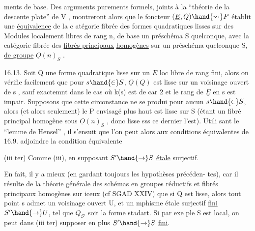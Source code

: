 
ments de base. Des arguments purements formels, joints à la
``théorie de la descente plate'' de  V  , montreront alors que le foncteur
$(\underline{E},Q) \hand{\rightsquigarrow} P$ établit une \uline{équivalence} de la c atégorie fibrée des formes
quadratiques lisses sur des Modules localement libres de rang n, de base
un préschéma S quelconque, avec la catégorie fibrée des \uline{fibrés principaux}
\uline{homogènes} sur un préschéma quelconque S, \uline{de groupe} $\underline{O}(n)_S$ .

16.13. Soit Q une forme quadratique lisse sur un $\underline{E}$ loc libre de
rang fini, alors on vérifie facilement que pour $s \hand{\in} S$, $\underline{O}(Q)$ est lisse
sur un voisinage ouvert de s ,  sauf exactemnt dans
le cas où k(s) est de car 2 et le rang de $\underline{E}$ en s est impair. Supposons
que cette circonstance ne se produi pour aucun $s \hand{\in} S$, alors (et alors
seulement) le P envisagé plus haut est lisse sur S (étant un fibré
principal homogène sous $\underline{O}(n)_S$ , donc lisse sss ce dernier l'est). Utili
sant le ``lemme de Hensel'' , il s'ensuit que  l'on peut alors aux
conditions équivalentes de 16.9. adjoindre la condition  équivalente

(iii ter)  Comme (iii), en supposant $S' \hand{\to} S$
\uline{étale} surjectif.

En fait, il y a mieux (en gardant toujours les hypothèses précéden-%
tes), car il résulte de la théorie générale des schémas en groupes réductifs
et fibrés principaux homogènes sur iceux (cf SGAD XXIV) que  si Q est
lisse, alors tout point s admet un voisinage ouvert U, et un mphisme
étale surjectif \uline{fini} $S' \hand{\to} U$, tel que $Q_{S'}$ soit la forme stadart. Si par exe
ple S est local, on peut dans (iii ter) supposer en plus $S' \hand{\to} S$ \uline{fini}.

